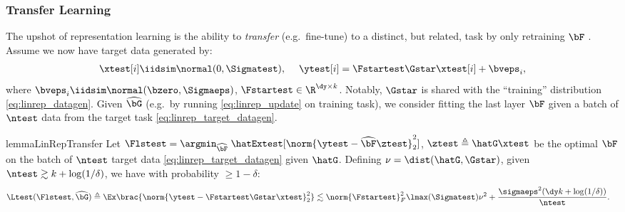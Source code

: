 \subsubsection{Transfer Learning}\label{sec:lin_rep_BN}
The upshot of representation learning is the ability to \emph{transfer} (e.g.\ fine-tune) to a distinct, but related, task by only retraining $\bF$ \citep{du2020few, kumar2022fine}. Assume we now have target data generated by:
\begin{align}\label{eq:linrep_target_datagen}
    \xtest[i] \iidsim \normal(0, \Sigmatest),\quad\; \ytest[i] = \Fstartest \Gstar \xtest[i] + \bveps_i,
\end{align}
where $\bveps_i \iidsim \normal(\bzero, \Sigmaeps)$, $\Fstartest \in \R^{\dy \times k}$. Notably, $\Gstar$ is shared with the ``training'' distribution \eqref{eq:linrep_datagen}. Given $\widehat\bG$ (e.g.\ by running \eqref{eq:linrep_update} on training task), we consider fitting the last layer $\bF$ given a batch of $\ntest$ data from the target task \eqref{eq:linrep_target_datagen}.
\begin{restatable}{lemma}{LinRepTransfer}\label{lem:linrep_transfer}
    Let $\Flstest = \argmin_{\widehat \bF} \; \hatExtest[\norm{\ytest - \widehat \bF \ztest}_2^2]$, $\ztest \triangleq \hatG \xtest$ be the optimal $\bF$ on the batch of $\ntest$ target data \eqref{eq:linrep_target_datagen} given $\hatG$. Defining $\nu = \dist(\hatG, \Gstar)$, given $\ntest \gtrsim k + \log(1/\delta)$, we have with probability $\geq 1-\delta$:
    \begin{align*}
        &\Ltest(\Flstest, \widehat \bG) \triangleq \Ex\brac{\norm{\ytest - \Fstartest\Gstar\xtest}_2^2} 
        \lesssim \norm{\Fstartest}^2_F\lmax(\Sigmatest) \nu^2  + \frac{\sigmaeps^2(\dy k + \log(1/\delta))}{\ntest}.
    \end{align*}
\end{restatable}

